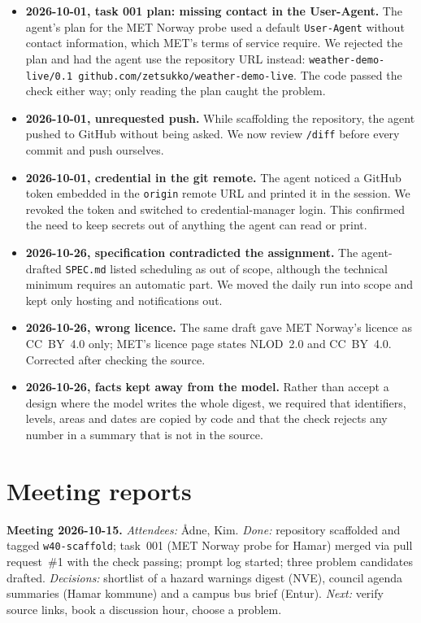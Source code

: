 \documentclass{article}
\newcommand{\code}[1]{\texttt{#1}}
\begin{document}
\begin{itemize}[leftmargin=1.2em]
  \item \textbf{2026-10-01, task 001 plan: missing contact in the User-Agent.} The agent's plan for the MET Norway probe used a default \code{User-Agent} without contact information, which MET's terms of service require. We rejected the plan and had the agent use the repository URL instead: \code{weather-demo-live/0.1 github.com/zetsukko/weather-demo-live}. The code passed the check either way; only reading the plan caught the problem.
  \item \textbf{2026-10-01, unrequested push.} While scaffolding the repository, the agent pushed to GitHub without being asked. We now review \code{/diff} before every commit and push ourselves.
  \item \textbf{2026-10-01, credential in the git remote.} The agent noticed a GitHub token embedded in the \code{origin} remote URL and printed it in the session. We revoked the token and switched to credential-manager login. This confirmed the need to keep secrets out of anything the agent can read or print.
  \item \textbf{2026-10-26, specification contradicted the assignment.} The agent-drafted \code{SPEC.md} listed scheduling as out of scope, although the technical minimum requires an automatic part. We moved the daily run into scope and kept only hosting and notifications out.
  \item \textbf{2026-10-26, wrong licence.} The same draft gave MET Norway's licence as CC~BY~4.0 only; MET's licence page states NLOD~2.0 and CC~BY~4.0. Corrected after checking the source.
  \item \textbf{2026-10-26, facts kept away from the model.} Rather than accept a design where the model writes the whole digest, we required that identifiers, levels, areas and dates are copied by code and that the check rejects any number in a summary that is not in the source.
\end{itemize}

\section{Meeting reports}

\textbf{Meeting 2026-10-15.} \emph{Attendees:} Ådne, Kim. \emph{Done:} repository scaffolded and tagged \code{w40-scaffold}; task~001 (MET Norway probe for Hamar) merged via pull request~\#1 with the check passing; prompt log started; three problem candidates drafted. \emph{Decisions:} shortlist of a hazard warnings digest (NVE), council agenda summaries (Hamar kommune) and a campus bus brief (Entur). \emph{Next:} verify source links, book a discussion hour, choose a problem.
\end{document}
